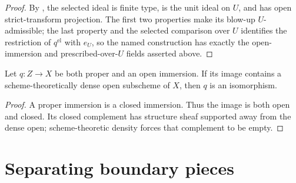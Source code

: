 \begin{proof}
  \leanok
  By , the selected ideal is finite type,
  is the unit ideal on $U$, and has open strict-transform projection.  The
  first two properties make its blow-up $U$-admissible; the last property and
  the selected comparison over $U$ identifies the restriction of
  $q^{\mathrm{el}}$ with $e_U$, so the named construction has exactly the
  open-immersion and prescribed-over-$U$ fields asserted above.
\end{proof}

\begin{lemma}
  \label{lemma:nagata-proper-open-dense-iso}

  Let $q\colon Z\to X$ be both proper and an open immersion.  If its image
  contains a scheme-theoretically dense open subscheme of $X$, then $q$ is an
  isomorphism.
\end{lemma}

\begin{proof}
  A proper immersion is a closed immersion.  Thus the image is both open and
  closed.  Its closed complement has structure sheaf supported away from the
  dense open; scheme-theoretic density forces that complement to be empty.
\end{proof}

\section{Separating boundary pieces}

